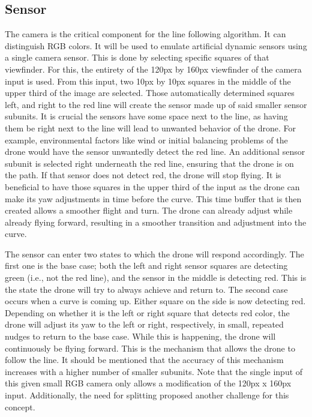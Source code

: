 \documentclass[a4paper, 10pt, conference]{IEEEtran}
\begin{document}
\subsection{Sensor}
The camera is the critical component for the line following algorithm. It can distinguish RGB colors. It will be used to emulate artificial dynamic sensors using a single camera sensor. This is done by selecting specific squares of that viewfinder. For this, the entirety of the 120px by 160px viewfinder of the camera input is used. From this input, two 10px by 10px squares in the middle of the upper third of the image are selected. Those automatically determined squares left, and right to the red line will create the sensor made up of said smaller sensor subunits. It is crucial the sensors have some space next to the line, as having them be right next to the line will lead to unwanted behavior of the drone. For example, environmental factors like wind or initial balancing problems of the drone would have the sensor unwantedly detect the red line. An additional sensor subunit is selected right underneath the red line, ensuring that the drone is on the path. If that sensor does not detect red, the drone will stop flying. It is beneficial to have those squares in the upper third of the input as the drone can make its yaw adjustments in time before the curve. This time buffer that is then created allows a smoother flight and turn. The drone can already adjust while already flying forward, resulting in a smoother transition and adjustment into the curve.\\\par
The sensor can enter two states to which the drone will respond accordingly.
The first one is the base case; both the left and right sensor squares are detecting green (i.e., not the red line), and the sensor in the middle is detecting red. This is the state the drone will try to always achieve and return to.
The second case occurs when a curve is coming up. Either square on the side is now detecting red. Depending on whether it is the left or right square that detects red color, the drone will adjust its yaw to the left or right, respectively, in small, repeated nudges to return to the base case. While this is happening, the drone will continuously be flying forward. This is the mechanism that allows the drone to follow the line.
It should be mentioned that the accuracy of this mechanism increases with a higher number of smaller subunits. Note that the single input of this given small RGB camera only allows a modification of the 120px x 160px input. Additionally, the need for splitting proposed another challenge for this concept.
\end{document}
